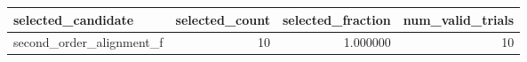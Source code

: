 \begin{tabular}{lrrr}
\toprule
selected_candidate & selected_count & selected_fraction & num_valid_trials \\
\midrule
second_order_alignment_f & 10 & 1.000000 & 10 \\
\bottomrule
\end{tabular}
